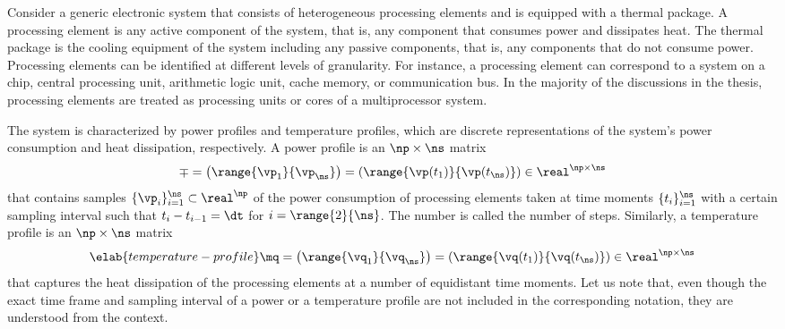 Consider a generic electronic system that consists of \np heterogeneous
processing elements and is equipped with a thermal package. A processing element
is any active component of the system, that is, any component that consumes
power and dissipates heat. The thermal package is the cooling equipment of the
system including any passive components, that is, any components that do not
consume power. Processing elements can be identified at different levels of
granularity. For instance, a processing element can correspond to a system on a
chip, central processing unit, arithmetic logic unit, cache memory, or
communication bus. In the majority of the discussions in the thesis, processing
elements are treated as processing units or cores of a multiprocessor system.

The system is characterized by power profiles and temperature profiles, which
are discrete representations of the system's power consumption and heat
dissipation, respectively. A power profile is an $\np \times \ns$ matrix
\[
  \mp
  = \left(\range{\vp_1}{\vp_\ns}\right)
  = \left(\range{\vp(t_1)}{\vp(t_\ns)}\right) \in \real^{\np \times \ns}
\]
that contains \ns samples $\{ \vp_i \}_{i = 1}^\ns \subset \real^\np$ of the
power consumption of \np processing elements taken at \ns time moments $\{ t_i
\}_{i = 1}^\ns$ with a certain sampling interval \dt such that $t_i - t_{i - 1}
= \dt$ for $i = \range{2}{\ns}$. The number \ns is called the number of steps.
Similarly, a temperature profile is an $\np \times \ns$ matrix
\begin{equation} \elab{temperature-profile}
  \mq
  = \left(\range{\vq_1}{\vq_\ns}\right)
  = \left(\range{\vq(t_1)}{\vq(t_\ns)}\right) \in \real^{\np \times \ns}
\end{equation}
that captures the heat dissipation of the processing elements at a number of
equidistant time moments. Let us note that, even though the exact time frame and
sampling interval of a power or a temperature profile are not included in the
corresponding notation, they are understood from the context.
